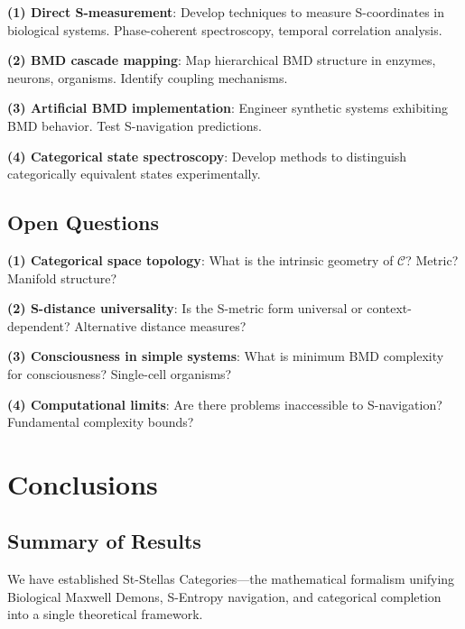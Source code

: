 \documentclass[12pt,a4paper]{article}
\begin{document}
\textbf{(1) Direct S-measurement}: Develop techniques to measure S-coordinates in biological systems. Phase-coherent spectroscopy, temporal correlation analysis.

\textbf{(2) BMD cascade mapping}: Map hierarchical BMD structure in enzymes, neurons, organisms. Identify coupling mechanisms.

\textbf{(3) Artificial BMD implementation}: Engineer synthetic systems exhibiting BMD behavior. Test S-navigation predictions.

\textbf{(4) Categorical state spectroscopy}: Develop methods to distinguish categorically equivalent states experimentally.

\subsection{Open Questions}

\textbf{(1) Categorical space topology}: What is the intrinsic geometry of $\mathcal{C}$? Metric? Manifold structure?

\textbf{(2) S-distance universality}: Is the S-metric form universal or context-dependent? Alternative distance measures?

\textbf{(3) Consciousness in simple systems}: What is minimum BMD complexity for consciousness? Single-cell organisms?

\textbf{(4) Computational limits}: Are there problems inaccessible to S-navigation? Fundamental complexity bounds?

\section{Conclusions}

\subsection{Summary of Results}

We have established St-Stellas Categories—the mathematical formalism unifying Biological Maxwell Demons, S-Entropy navigation, and categorical completion into a single theoretical framework.
\end{document}
